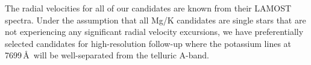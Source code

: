 \documentclass{article}
\begin{document}
\begin{technicalinfo}

The radial velocities for all of our candidates are known from their LAMOST spectra. Under the assumption that all Mg/K candidates are single stars that are not experiencing any significant radial velocity excursions, we have preferentially selected candidates for high-resolution follow-up where the potassium lines at 7699\,\AA\ will be well-separated from the telluric A-band.
\end{technicalinfo}



\begin{smoka}
\smokacheck
\end{smoka} 





\end{document}
